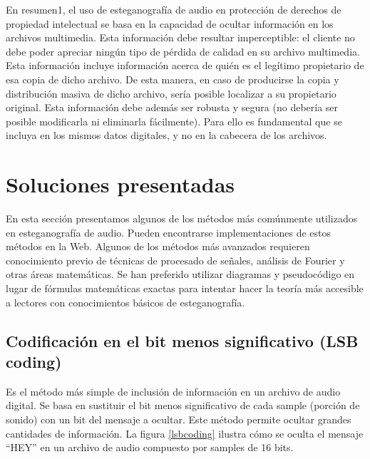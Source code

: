 \documentclass[12pt]{article}
\begin{document}
En resumen1, el uso de esteganografía de audio en protección de derechos de propiedad intelectual se basa en la capacidad de ocultar información en los archivos multimedia. Esta información debe resultar imperceptible: el cliente no debe poder apreciar ningún tipo de pérdida de calidad en su archivo multimedia. Esta información incluye información acerca de quién es el legítimo propietario de esa copia de dicho archivo. De esta manera, en caso de producirse la copia y distribución masiva de dicho archivo, sería posible localizar a su propietario original. Esta información debe además ser robusta y segura (no debería ser posible modificarla ni eliminarla fácilmente). Para ello es fundamental que se incluya en los mismos datos digitales, y no en la cabecera de los archivos.

\newpage
\section{Soluciones presentadas}

En esta sección presentamos algunos de los métodos más comúnmente utilizados en esteganografía de audio. Pueden encontrarse implementaciones de estos métodos en la Web. Algunos de los métodos más avanzados requieren conocimiento previo de técnicas de procesado de señales, análisis de Fourier y otras áreas matemáticas. Se han preferido utilizar diagramas y pseudocódigo en lugar de fórmulas matemáticas exactas para intentar hacer la teoría más accesible a lectores con conocimientos básicos de esteganografía.

\subsection{Codificación en el bit menos significativo (LSB coding)}

Es el método más simple de inclusión de información en un archivo de audio digital. Se basa en sustituir el bit menos significativo de cada sample (porción de sonido) con un bit del mensaje a ocultar. Este método permite ocultar grandes cantidades de información. La figura \ref{lsbcoding} ilustra cómo se oculta el mensaje ``HEY'' en un archivo de audio compuesto por samples de 16 bits.
\end{document}
